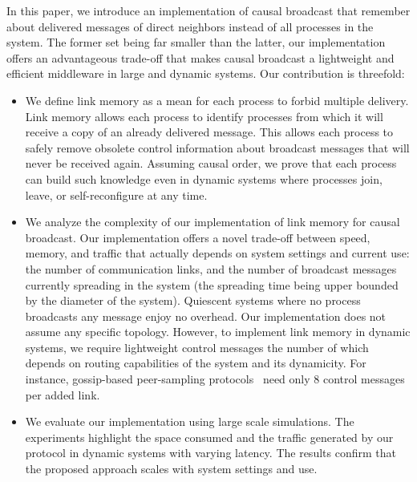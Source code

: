 
In this paper, we introduce an implementation of causal broadcast that remember
about delivered messages of direct neighbors instead of all processes in the
system.  The former set being far smaller than the latter, our implementation
offers an advantageous trade-off that makes causal broadcast a lightweight and
efficient middleware in large and dynamic systems.
Our contribution is threefold:
\begin{itemize}[leftmargin=*]
\item We define link memory as a mean for each process to forbid multiple
  delivery. %
  Link memory allows each process to identify processes from which it
  will receive a copy of an already delivered message. This allows each process
  to safely remove obsolete control information about broadcast messages that
  will never be received again. Assuming causal order, we prove that each
  process can build such knowledge even in dynamic systems where processes join,
  leave, or self-reconfigure at any time.
\item We analyze the complexity of our implementation of link memory for causal
  broadcast. Our implementation offers a novel trade-off between speed, memory,
  and traffic that actually depends on system settings and current use: the
  number of communication links, and the number of broadcast messages currently
  spreading in the system (the spreading time being upper bounded by the
  diameter of the system). Quiescent systems where no process broadcasts any
  message enjoy no overhead. Our implementation does not assume any specific
  topology. However, to implement link memory in dynamic systems, we require
  lightweight control messages the number of which depends on routing
  capabilities of the system and its dynamicity.  For instance, gossip-based
  peer-sampling
  protocols~\cite{jelasity2007gossip,jelasity2009tman,nedelec2017adaptive} need
  only 8 control messages per added link.
\item We evaluate our implementation using large scale simulations. The
  experiments highlight the space consumed and the traffic generated by our
  protocol in dynamic systems with varying latency. The results confirm that the
  proposed approach scales with system settings and use.
\end{itemize}
